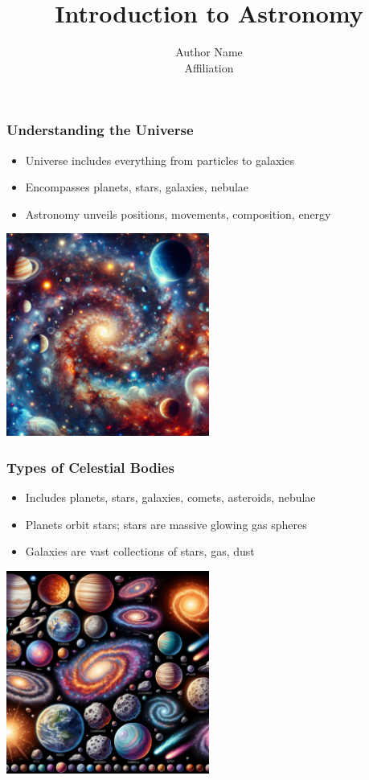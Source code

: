 \documentclass{beamer}
\title{Introduction to Astronomy}
\author{Author Name\\Affiliation}
\date{}
\begin{document}
\begin{frame}
    \titlepage
\end{frame}

\begin{frame}
    \frametitle{Understanding the Universe}
    \begin{itemize}
        \item Universe includes everything from particles to galaxies
        \item Encompasses planets, stars, galaxies, nebulae
        \item Astronomy unveils positions, movements, composition, energy
    \end{itemize}
    \centering
    \includegraphics[width=0.5\textwidth]{./images/universe.png}
\end{frame}

\begin{frame}
    \frametitle{Types of Celestial Bodies}
    \begin{itemize}
        \item Includes planets, stars, galaxies, comets, asteroids, nebulae
        \item Planets orbit stars; stars are massive glowing gas spheres
        \item Galaxies are vast collections of stars, gas, dust
    \end{itemize}
    \centering
    \includegraphics[width=0.5\textwidth]{./images/celestial_bodies.png}
\end{frame}
\end{document}
